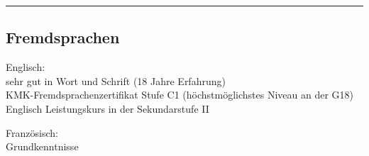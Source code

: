 \documentclass[10pt,letterpaper]{article}
\newenvironment{indentsection}[1]%
{\begin{list}{}%
	{\setlength{\leftmargin}{#1}}%
	\item[]%
}
{\end{list}}
\begin{document}
\hrule
\vspace{-0.4em}
\subsection*{Fremdsprachen}

\begin{indentsection}{\parindent}
	\begin{description*}
		\item[Englisch:] ~\\ sehr gut in Wort und Schrift (18 Jahre Erfahrung) \\ KMK-Fremdsprachenzertifikat Stufe C1 (höchstmöglichstes Niveau an der G18) \\ Englisch Leistungskurs in der Sekundarstufe II
		\item[Französisch:] ~\\ Grundkenntnisse
	\end{description*}
\end{indentsection}
\end{document}
